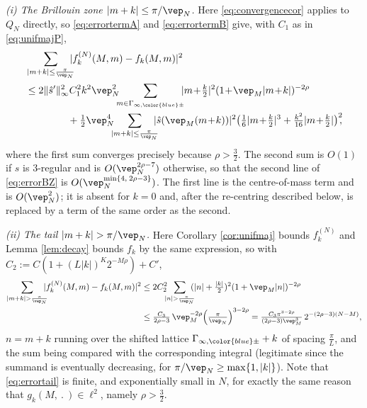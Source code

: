 \documentclass[a4paper, 11pt]{article}
\newcommand{\ltwo}{\ell^{2}}
\DeclareMathOperator{\1}{\mathds{1}}
\begin{document}
\emph{(i) The Brillouin zone $|m+k|\leq\pi/\vep_{N}$.} Here \eqref{eq:convergencecor} applies to $Q_{N}$ directly, so \eqref{eq:errortermA} and \eqref{eq:errortermB} give, with $C_{1}$ as in \eqref{eq:unifmajP},
\begin{align}
\label{eq:errorBZ}
& \sum_{|m+k|\leq\frac{\pi}{\vep_{N}}}\!\!\!\!|f^{(N)}_{k}(M,m)-f_{k}(M,m)|^{2} \\ \nonumber
& \leq 2\|\hat{s}'\|_{\infty}^{2}C_{1}^{2}k^{2}\vep_{N}^{2}\!\!\!\sum_{m\in\Gamma_{\infty,{\color{blue}\pm}}}\!\!\!|m\!+\!\tfrac{k}{2}|^{2}(1\!+\!\vep_{M}|m\!+\!k|)^{-2\rho} \\ \nonumber
& \hspace{1.5cm} +\tfrac{1}{2}\vep_{N}^{4}\!\!\!\sum_{|m+k|\leq\frac{\pi}{\vep_{N}}}\!\!\!\!|\hat{s}(\vep_{M}(m\!+\!k))|^{2}\big(\tfrac{1}{6}|m\!+\!\tfrac{k}{2}|^{3}+\tfrac{k^{2}}{16}|m\!+\!\tfrac{k}{2}|\big)^{2}\!\!,
\end{align}
where the first sum converges precisely because $\rho>\tfrac{3}{2}$. The second sum is $O(1)$ if $s$ is $3$-regular and is $O(\vep_{N}^{2\rho-7})$ otherwise, so that the second line of \eqref{eq:errorBZ} is $O(\vep_{N}^{\min\{4,\!\ 2\rho-3\}})$. The first line is the centre-of-mass term and is $O(\vep_{N}^{2})$; it is absent for $k=0$ and, after the re-centring described below, is replaced by a term of the same order as the second.

\emph{(ii) The tail $|m+k|>\pi/\vep_{N}$.} Here Corollary \ref{cor:unifmaj} bounds $f^{(N)}_{k}$ and Lemma \ref{lem:decay} bounds $f_{k}$ by the same expression, so with $C_{2}:=C(1+(L|k|)^{K}2^{-M\rho})+C'$,
\begin{align}
\label{eq:errortail}
\sum_{|m+k|>\frac{\pi}{\vep_{N}}}\!\!\!\!|f^{(N)}_{k}(M,m)-f_{k}(M,m)|^{2} & \leq 2C_{2}^{2}\!\!\!\sum_{|n|>\frac{\pi}{\vep_{N}}}\!\!\!(|n|+\tfrac{|k|}{2})^{2}(1+\vep_{M}|n|)^{-2\rho} \\ \nonumber
& \leq \tfrac{C_{3}}{2\rho-3}\!\ \vep_{M}^{-2\rho}\Big(\tfrac{\pi}{\vep_{N}}\Big)^{3-2\rho} = \tfrac{C_{3}\pi^{3-2\rho}}{(2\rho-3)\vep_{M}^{3}}\!\ 2^{-(2\rho-3)(N-M)},
\end{align}
$n=m+k$ running over the shifted lattice $\Gamma_{\infty,{\color{blue}\pm}}+k$ of spacing $\tfrac{\pi}{L}$, and the sum being compared with the corresponding integral (legitimate since the summand is eventually decreasing, for $\pi/\vep_{N}\geq\max\{1,|k|\}$). Note that \eqref{eq:errortail} is finite, and exponentially small in $N$, for exactly the same reason that $g_{k}(M,\!\ .\!\ )\in\ltwo$, namely $\rho>\tfrac{3}{2}$.
\end{document}
